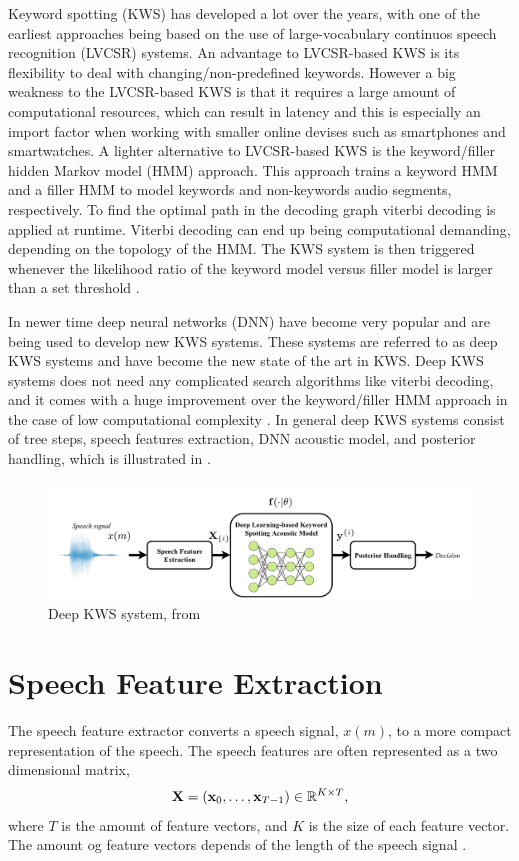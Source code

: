 Keyword spotting (KWS) has developed a lot over the years, with one of the earliest approaches being based on the use of large-vocabulary continuos speech recognition (LVCSR) systems. An advantage to LVCSR-based KWS is its flexibility to deal with changing/non-predefined keywords. However a big weakness to the LVCSR-based KWS is that it requires a large amount of computational resources, which can result in latency and this is especially an import factor when working with smaller online devises such as smartphones and smartwatches. A lighter alternative to LVCSR-based KWS is the keyword/filler hidden Markov model (HMM) approach. This approach trains a keyword HMM and a filler HMM to model keywords and non-keywords audio segments, respectively. To find the optimal path in the decoding graph viterbi decoding is applied at runtime. Viterbi decoding can end up being computational demanding, depending on the topology of the HMM. The KWS system is then triggered whenever the likelihood ratio of the keyword model versus filler model is larger than a set threshold \cite{lopez2021deep}. 

In newer time deep neural networks (DNN) have become very popular and are being used to develop new KWS systems. These systems are referred to as deep KWS systems and have become the new state of the art in KWS. Deep KWS systems does not need any complicated search algorithms like viterbi decoding, and it comes with a huge improvement over the keyword/filler HMM approach in the case of low computational complexity \cite{lopez2021deep}. In general deep KWS systems consist of tree steps, speech features extraction, DNN acoustic model, and posterior handling, which is illustrated in .

\begin{figure}[h]
    \centering
    \includegraphics[width=\textwidth]{incl/img/kws/deep_kws_system.png}
    \caption{ Deep KWS system, from \cite{lopez2021deep}}
    \label{fig:deep_kws_system}
\end{figure}

\section{Speech Feature Extraction}
The speech feature extractor converts a speech signal, \(x(m)\), to a more compact representation of the speech. The speech features are often represented as a two dimensional matrix,
\begin{align}
    \textbf{X} = (\textbf{x}_0, \dots, \textbf{x}_{T-1}) \in \mathbb{R}^{K\times T},
\end{align}
where \(T\) is the amount of feature vectors, and \(K\) is the size of each feature vector. The amount og feature vectors depends of the length of the speech signal \cite{lopez2021deep}. 

